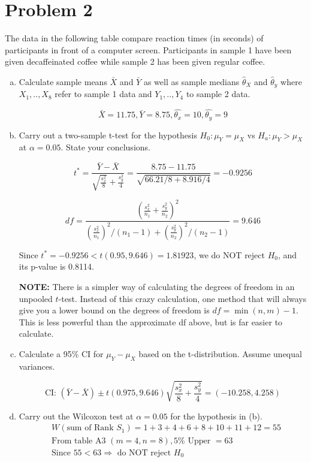 \documentclass[12pt]{article}
\begin{document}
\section*{Problem 2}
The data in the following table compare reaction times (in seconds) of participants in front
of a computer screen. Participants in sample 1 have been given decaffeinated coffee while sample
2 has been given regular coffee.

\begin{enumerate}[(a)]
\item Calculate sample means $\bar X$ and $\bar Y$ as well as sample medians $\hat\theta_X$ and $\hat\theta_y$ where $X_1,..,X_8$ refer to sample 1 data and $Y_1,..,Y_4$ to sample 2 data.

\[ \bar{X}=11.75, \bar{Y}=8.75, \hat{\theta_x}=10, \hat{\theta_y}=9 \]

\item Carry out a two-sample t-test for the hypothesis $H_0:\mu_Y=\mu_X$ vs $H_a:\mu_Y>\mu_X$ at $\alpha=0.05$. State your conclusions.

\[t^*=\frac{\bar{Y}-\bar{X}}{\sqrt{\frac{s_x^2}{8}}+\frac{s_y^2}{4}}=\frac{8.75-11.75}{\sqrt{66.21/8+8.916/4}}=-0.9256 \]

\[ df= \frac{(\frac{s_x^2}{n_1}+\frac{s_y^2}{n_2})^2}{(\frac{s_x^2}{n_1})^2/(n_1-1)+(\frac{s_y^2}{n_2})^2/(n_2-1)}=9.646 \]

Since $t^* = -0.9256 < t(0.95,9.646) = 1.81923$, we do NOT reject $H_0$, and its p-value  is 0.8114.

\textbf{NOTE: } There is a simpler way of calculating the degrees of freedom in an unpooled $t$-test. Instead of this crazy calculation, one method that will always give you a lower bound on the degrees of freedom is $df = \min(n, m) - 1$. This is less powerful than the approximate df above, but is far easier to calculate.

\item Calculate a 95\% CI for $\mu_Y-\mu_X$ based on the t-distribution. Assume unequal variances.

\[ \text{CI: } (\bar{Y}-\bar{X}) \pm t(0.975,9.646) \sqrt{ \frac{s_x^2}{8} + \frac{s_y^2}{4} } = (-10.258, 4.258) \]

\item Carry out the Wilcoxon test at $\alpha=0.05$ for the hypothesis in (b).
\begin{align*}
& W(\text{sum of Rank } S_1)=1+3+4+6+8+10+11+12=55 \\
& \text{From table A3 } (m=4, n=8), 5\% \text{ Upper } = 63\\
& \text{Since } 55<63 \Rightarrow \text{ do NOT reject } H_0\\
\end{align*}
\vspace{-3em}


\end{enumerate}
\end{document}
